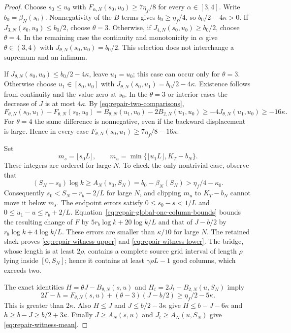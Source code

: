 \documentclass[11pt]{article}
\numberwithin{equation}{section}
\newcommand{\1}{\mathbf 1}
\begin{document}
\begin{proof}
Choose $s_0\le u_0$ with
$F_{\alpha,N}(s_0,u_0)\ge7\eta_f/8$ for every $\alpha\in[3,4]$.
Write $b_0=\beta_N(s_0)$.  Nonnegativity of the $B$ terms gives
$b_0\ge\eta_f/4$, so $b_0/2-4\kappa>0$.
If $J_{3,N}(s_0,u_0)\le b_0/2$, choose $\theta=3$.
Otherwise, if $J_{4,N}(s_0,u_0)\ge b_0/2$, choose $\theta=4$.
In the remaining case the continuity and monotonicity in $\alpha$ give
$\theta\in(3,4)$ with $J_{\theta,N}(s_0,u_0)=b_0/2$.
This selection does not interchange a supremum and an infimum.

If $J_{\theta,N}(s_0,u_0)\le b_0/2-4\kappa$, leave $u_1=u_0$;
this case can occur only for $\theta=3$.  Otherwise choose
$u_1\in[s_0,u_0]$ with
$J_{\theta,N}(s_0,u_1)=b_0/2-4\kappa$.
Existence follows from continuity and the value zero at $s_0$.
In the $\theta=3$ or interior cases the decrease of $J$ is at most
$4\kappa$.  By \eqref{eq:repair-two-comparisons},
\[
 F_{\theta,N}(s_0,u_1)-F_{\theta,N}(s_0,u_0)
 =B_{\theta,N}(u_1,u_0)-2B_{2,N}(u_1,u_0)
 \ge-4J_{\theta,N}(u_1,u_0)\ge-16\kappa.
\]
For $\theta=4$ the same difference is nonnegative, even if the
backward displacement is large.  Hence in every case
$F_{\theta,N}(s_0,u_1)\ge7\eta_f/8-16\kappa$.

Set
\[
 m_s=\lfloor s_0L\rfloor,\qquad
 m_u=\min\{\lfloor u_1L\rfloor,K_T-b_N\}.
\]
These integers are ordered for large $N$.  To check the only nontrivial
case, observe that
\[
 (S_N-s_0)\log k\ge A_N(s_0,S_N)
 =b_0-\beta_N(S_N)>\eta_f/4-\kappa_0.
\]
Consequently $s_0<S_N-r_b-2/L$ for large $N$, and clipping $m_u$ to
$K_T-b_N$ cannot move it below $m_s$.
The endpoint errors satisfy $0\le s_0-s<1/L$ and
$0\le u_1-u\le r_b+2/L$.
Equation~\eqref{eq:repair-global-one-column-bounds} bounds the resulting
change of $F$ by $5r_b\log k+20\log k/L$ and that of
$J-b/2$ by $r_b\log k+4\log k/L$.
These errors are smaller than $\kappa/10$ for large $N$.
The retained slack proves \eqref{eq:repair-witness-upper} and
\eqref{eq:repair-witness-lower}.
The bridge, whose length is at least $2\rho$, contains a complete
source grid interval of length $\rho$ lying inside $[0,S_N]$; hence it
contains at least $\gamma\rho L-1$ good columns, which exceeds two.

The exact identities $H=\theta J-B_{\theta,N}(s,u)$ and
$H_t=2J_t-B_{2,N}(u,S_N)$ imply
\[
 2\Gamma-h=F_{\theta,N}(s,u)+(\theta-3)(J-b/2)
 \ge\eta_f/2-5\kappa.
\]
This is greater than $2\kappa$.
Also $H\le J$ and $J\le b/2-3\kappa$ give
$H\le b-J-6\kappa$ and $h\ge b-J\ge b/2+3\kappa$.
Finally $J\ge A_N(s,u)$ and $J_t\ge A_N(u,S_N)$ give
\eqref{eq:repair-witness-mean}.
\end{proof}
\end{document}
